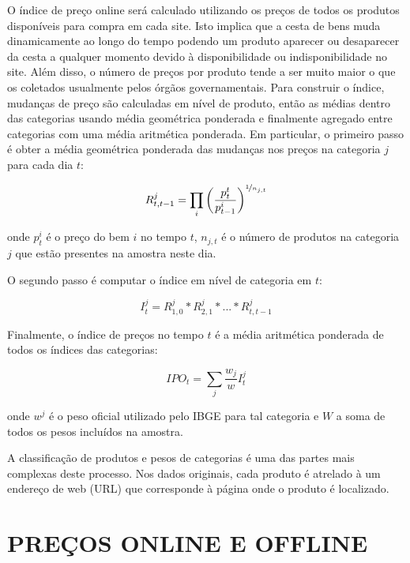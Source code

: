\documentclass[twoside,a4paper,12pt]{report}
\begin{document}
  O índice de preço online será calculado utilizando os preços de todos os produtos disponíveis para compra em cada site. Isto implica que a cesta de bens muda dinamicamente ao longo do tempo podendo um produto aparecer ou desaparecer da cesta a qualquer momento devido à disponibilidade ou indisponibilidade no site. Além disso, o número de preços por produto tende a ser muito maior o que os coletados usualmente pelos órgãos governamentais. 
Para construir o índice, mudanças de preço são calculadas em nível de produto, então as médias dentro das categorias usando média geométrica ponderada e finalmente agregado entre categorias com uma média aritmética ponderada. Em particular, o primeiro passo é obter a média geométrica ponderada das mudanças nos preços na categoria $j$ para cada dia $t$:

\begin{equation}\label{eq1}
R_{t,t-1}^{j}=\prod_{i}\left(\frac{p_{t}^{t}}{p_{t-1}^{i}}\right)^{\nicefrac{1}{n_{j,t}}}
\end{equation}

\noindent onde $p_{t}^{i}$ é o preço do bem $i$ no tempo $t$, $n_{j,t}$ é o número de produtos na categoria $j$ que estão presentes na amostra neste dia. 

O segundo passo é computar o índice em nível de categoria em $t$:

\begin{equation}\label{eq2}
I_{t}^{j}=R_{1,0}^{j}\ast{R}_{2,1}^{j}\ast{...}\ast{R}_{t,t-1}^{j}
\end{equation}

Finalmente, o índice de preços no tempo $t$ é a média aritmética ponderada de todos os índices das categorias:

\begin{equation}
IPO_{t}=\sum_{j}{\frac{w_{j}}{w}I_{t}^{j}} 
\end{equation}

\noindent onde $w^{j}$ é o peso oficial utilizado pelo IBGE para tal categoria e $W$ a soma de todos os pesos incluídos na amostra.

A classificação de produtos e pesos de categorias é uma das partes mais complexas deste processo. Nos dados originais, cada produto é atrelado à um endereço de web (URL) que corresponde à página onde o produto é localizado. 

\section*{PREÇOS ONLINE E OFFLINE}
\end{document}
